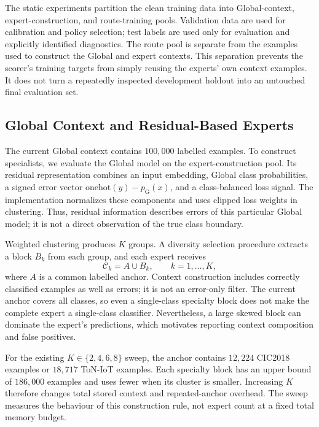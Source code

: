 \documentclass[sigconf,anonymous,pbalance]{acmart}
\newcommand{\globalidx}{\mathrm{G}}
\newcommand{\ctx}{\mathcal{C}}
\begin{document}
The static experiments partition the clean training data into Global-context, expert-construction, and route-training pools. Validation data are used for calibration and policy selection; test labels are used only for evaluation and explicitly identified diagnostics. The route pool is separate from the examples used to construct the Global and expert contexts. This separation prevents the scorer's training targets from simply reusing the experts' own context examples. It does not turn a repeatedly inspected development holdout into an untouched final evaluation set.

\subsection{Global Context and Residual-Based Experts}
The current Global context contains $100{,}000$ labelled examples. To construct specialists, we evaluate the Global model on the expert-construction pool. Its residual representation combines an input embedding, Global class probabilities, a signed error vector $\mathrm{onehot}(y)-p_{\globalidx}(x)$, and a class-balanced loss signal. The implementation normalizes these components and uses clipped loss weights in clustering. Thus, residual information describes errors of this particular Global model; it is not a direct observation of the true class boundary.

Weighted clustering produces $K$ groups. A diversity selection procedure extracts a block $B_k$ from each group, and each expert receives
\begin{equation}
 \ctx_k=A\cup B_k,\qquad k=1,\ldots,K,
 \label{eq:context}
\end{equation}
where $A$ is a common labelled anchor. Context construction includes correctly classified examples as well as errors; it is not an error-only filter. The current anchor covers all classes, so even a single-class specialty block does not make the complete expert a single-class classifier. Nevertheless, a large skewed block can dominate the expert's predictions, which motivates reporting context composition and false positives.

For the existing $K\in\{2,4,6,8\}$ sweep, the anchor contains $12{,}224$ CIC2018 examples or $18{,}717$ ToN-IoT examples. Each specialty block has an upper bound of $186{,}000$ examples and uses fewer when its cluster is smaller. Increasing $K$ therefore changes total stored context and repeated-anchor overhead. The sweep measures the behaviour of this construction rule, not expert count at a fixed total memory budget.
\end{document}
